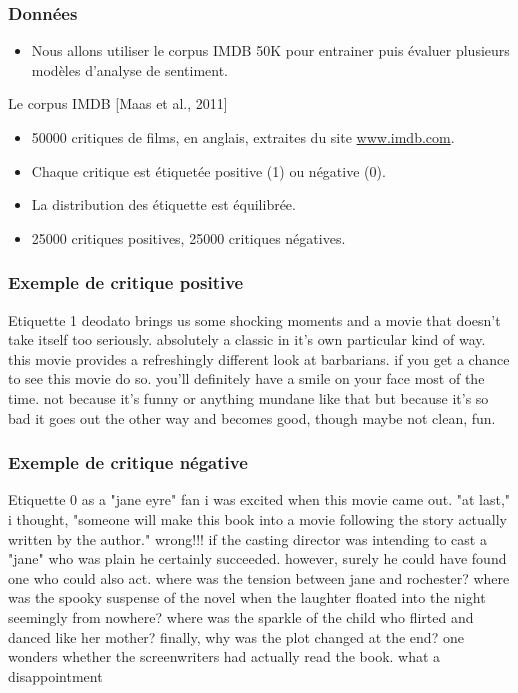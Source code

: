 \documentclass{beamer}
\begin{document}
\begin{frame}
  \frametitle{Donn\'ees}

  \begin{itemize}
  \item Nous allons utiliser le corpus IMDB 50K pour entrainer puis \'evaluer plusieurs mod\`eles d'analyse de sentiment. 
  \end{itemize}

  \begin{block}{Le corpus IMDB [Maas et al., 2011]}
    \begin{itemize}
    \item 50000 critiques de films, en anglais, extraites du site \url{www.imdb.com}.
    \item Chaque critique est \'etiquet\'ee positive (1) ou n\'egative (0).
    \item La distribution des \'etiquette est \'equilibr\'ee.
    \item 25000 critiques positives, 25000 critiques n\'egatives.
    \end{itemize}
  \end{block}
\end{frame}

\begin{frame}
  \frametitle{Exemple de critique positive}

  \begin{exampleblock}{Etiquette 1}
    deodato brings us some shocking moments and a movie that doesn't take itself too seriously. absolutely a classic in it's own particular kind of way. this movie provides a refreshingly different look at barbarians. if you get a chance to see this movie do so. you'll definitely have a smile on your face most of the time. not because it's funny or anything mundane like that but because it's so bad it goes out the other way and becomes good, though maybe not clean, fun.
  \end{exampleblock}

\end{frame}



\begin{frame}
  \frametitle{Exemple de critique n\'egative}

  \begin{alertblock}{Etiquette 0}
    as a "jane eyre" fan i was excited when this movie came out. "at last," i thought, "someone will make this book into a movie following the story actually written by the author." wrong!!! if the casting director was intending to cast a "jane" who was plain he certainly succeeded. however, surely he could have found one who could also act. where was the tension between jane and rochester? where was the spooky suspense of the novel when the laughter floated into the night seemingly from nowhere? where was the sparkle of the child who flirted and danced like her mother? finally, why was the plot changed at the end? one wonders whether the screenwriters had actually read the book. what a disappointment
  \end{alertblock}

\end{frame}
\end{document}
